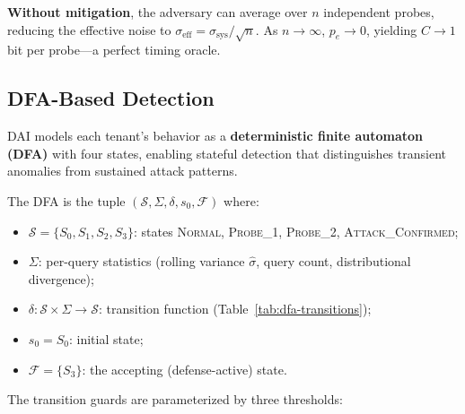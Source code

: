 \textbf{Without mitigation}, the adversary can average over $n$ independent probes,
reducing the effective noise to $\sigma_{\mathrm{eff}} = \sigma_{\mathrm{sys}} / \sqrt{n}$.
As $n \to \infty$, $p_e \to 0$, yielding $C \to 1$ bit per probe---a perfect timing oracle.

\subsection{DFA-Based Detection}
\label{sec:dai:dfa}

DAI models each tenant's behavior as a \textbf{deterministic finite automaton (DFA)} with
four states, enabling stateful detection that distinguishes transient anomalies from
sustained attack patterns.

\begin{definition}
The DFA is the tuple $(\mathcal{S}, \Sigma, \delta, s_0, \mathcal{F})$ where:
\begin{itemize}[leftmargin=1.5em,itemsep=2pt]
    \item $\mathcal{S} = \{S_0, S_1, S_2, S_3\}$: states \textsc{Normal},
          \textsc{Probe\_1}, \textsc{Probe\_2}, \textsc{Attack\_Confirmed};
    \item $\Sigma$: per-query statistics (rolling variance $\hat{\sigma}$, query count,
          distributional divergence);
    \item $\delta: \mathcal{S} \times \Sigma \to \mathcal{S}$: transition function
          (Table~\ref{tab:dfa-transitions});
    \item $s_0 = S_0$: initial state;
    \item $\mathcal{F} = \{S_3\}$: the accepting (defense-active) state.
\end{itemize}
\end{definition}

\noindent The transition guards are parameterized by three thresholds:

